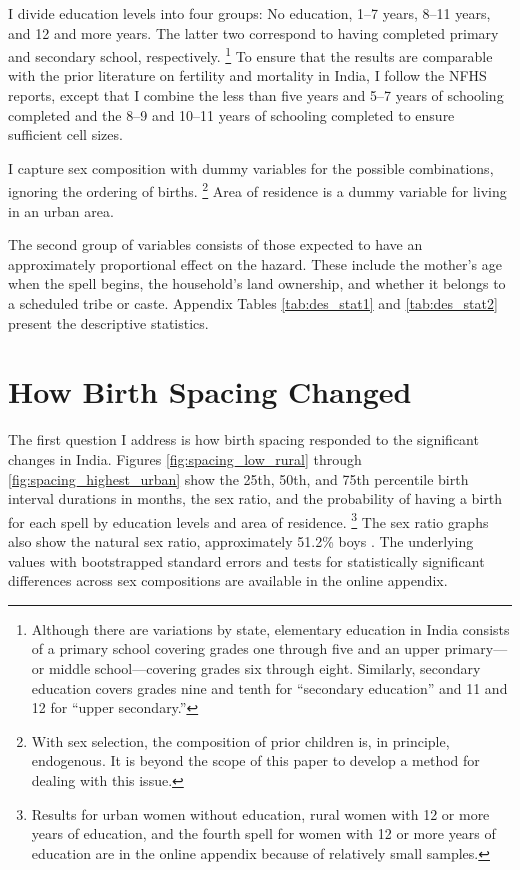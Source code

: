 \documentclass[12pt,letterpaper]{article}
\begin{document}
I divide education levels into four groups: No education, 1--7 years, 8--11 years, and 
12 and more years.
The latter two correspond to having completed primary and secondary school, 
respectively.%
\footnote{
Although there are variations by state, elementary education in India consists of a 
primary school covering grades one through five and an upper primary---or middle 
school---covering grades six through eight. 
Similarly, secondary education covers grades nine and tenth for ``secondary education'' 
and 11 and 12 for ``upper secondary.''
}
To ensure that the results are comparable with the prior literature on fertility
and mortality in India, I follow the NFHS reports, except that I combine the 
less than five years and 5--7 years of schooling completed and the 8--9 
and 10--11 years of schooling completed to ensure sufficient cell sizes.

I capture sex composition with dummy variables for the possible combinations, ignoring 
the ordering of births.%
\footnote{
With sex selection, the composition of prior children is, in principle, endogenous. 
It is beyond the scope of this paper to develop a method for dealing with this issue. 
}
Area of residence is a dummy variable for living in an urban area.

The second group of variables consists of those expected to have an approximately 
proportional effect on the hazard.
These include the mother's age when the spell begins, the household's
land ownership, and whether it belongs to a scheduled tribe or caste.
Appendix Tables \ref{tab:des_stat1} and \ref{tab:des_stat2} present the descriptive 
statistics.


\section{How Birth Spacing Changed\label{sec:results}}

The first question I address is how birth spacing responded to the significant 
changes in India.
Figures \ref{fig:spacing_low_rural} through \ref{fig:spacing_highest_urban}
show the 25th, 50th, and 75th percentile birth interval durations in 
months, the sex ratio, and the probability of having a birth for each spell
by education levels and area of residence.%
\footnote{
Results for urban women without education, rural women with 12 or more years of 
education, and the fourth spell for women with 12 or more years of education are
in the online appendix because of relatively small samples.
}
The sex ratio graphs also show the natural sex ratio, approximately 51.2\% boys
\citep{ben-porath76b,jacobsen99,Portner2015b}.
The underlying values with bootstrapped standard errors and tests for statistically
significant differences across sex compositions are available in the online appendix.
\end{document}
